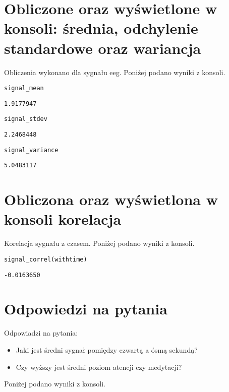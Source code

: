 \documentclass{article}
\begin{document}
\section{Obliczone oraz wyświetlone w konsoli: średnia, odchylenie standardowe oraz wariancja}

Obliczenia wykonano dla sygnału eeg.
Poniżej podano wyniki z konsoli.
\newline
\begin{mdframed}
\begin{alltt}
signal\_mean   
 
    1.9177947  
 
    
 
 signal\_stdev   
 
    2.2468448  
 
    
 
signal\_variance   
 
    5.0483117  
 
\end{alltt}
\end{mdframed}

\section{Obliczona oraz wyświetlona w konsoli korelacja}

Korelacja sygnału z czasem.
Poniżej podano wyniki z konsoli.
\newline
\begin{mdframed}
\begin{alltt}
signal\_correl (with time)   
 
  - 0.0163650  
\end{alltt}
\end{mdframed}


\section{Odpowiedzi na pytania}

Odpowiadzi na pytania:
\begin{itemize}
    \item{Jaki jest średni sygnał pomiędzy czwartą a ósmą sekundą?}
    \item{Czy wyższy jest średni  poziom atencji czy medytacji?}
\end{itemize}
Poniżej podano wyniki z konsoli.
\newline
\end{document}
